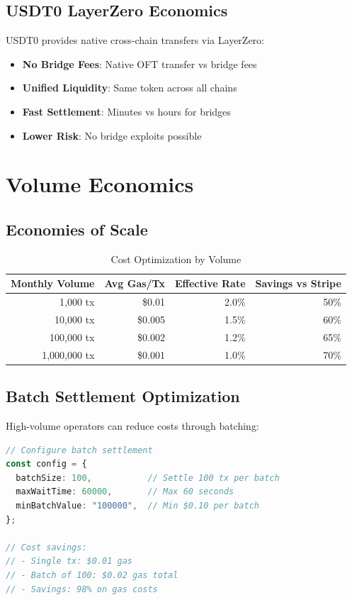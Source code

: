\subsection{USDT0 LayerZero Economics}

USDT0 provides native cross-chain transfers via LayerZero:

\begin{itemize}
    \item \textbf{No Bridge Fees}: Native OFT transfer vs bridge fees
    \item \textbf{Unified Liquidity}: Same token across all chains
    \item \textbf{Fast Settlement}: Minutes vs hours for bridges
    \item \textbf{Lower Risk}: No bridge exploits possible
\end{itemize}

\section{Volume Economics}
\label{sec:volume-economics}

\subsection{Economies of Scale}

\begin{table}[htbp]
\centering
\caption{Cost Optimization by Volume}
\label{tab:volume-optimization}
\footnotesize
\begin{tabular}{r r r r}
\toprule
\textbf{Monthly Volume} & \textbf{Avg Gas/Tx} & \textbf{Effective Rate} & \textbf{Savings vs Stripe} \\
\midrule
1,000 tx & \$0.01 & 2.0\% & 50\% \\
10,000 tx & \$0.005 & 1.5\% & 60\% \\
100,000 tx & \$0.002 & 1.2\% & 65\% \\
1,000,000 tx & \$0.001 & 1.0\% & 70\% \\
\bottomrule
\end{tabular}
\end{table}

\subsection{Batch Settlement Optimization}

High-volume operators can reduce costs through batching:

\begin{lstlisting}[language=typescript,caption={Batch settlement for cost optimization}]
// Configure batch settlement
const config = {
  batchSize: 100,           // Settle 100 tx per batch
  maxWaitTime: 60000,       // Max 60 seconds
  minBatchValue: "100000",  // Min $0.10 per batch
};

// Cost savings:
// - Single tx: $0.01 gas
// - Batch of 100: $0.02 gas total
// - Savings: 98% on gas costs
\end{lstlisting}

